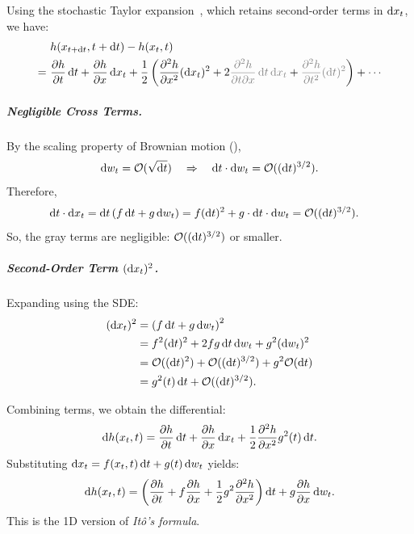 Using the stochastic Taylor expansion~\citep{kloeden1992stochastic}, which retains second-order terms in $\mathop{}\!\mathrm{d} x_t$, we have:
\begin{align*}
&h(x_{t+\diff t}, t+\diff t) 
- h(x_t, t) \\
=~&\frac{\partial h}{\partial t} \diff t 
+ \frac{\partial h}{\partial x} \diff x_t 
+ \frac{1}{2} \left( \frac{\partial^2 h}{\partial x^2} (\diff x_t)^2 
+ 2\textcolor{gray}{{\frac{\partial^2 h}{\partial t \partial x} \diff t \diff x_t}} 
+ \textcolor{gray}{{ \frac{\partial^2 h}{\partial t^2} (\diff t)^2}} \right)
+ \cdots
\end{align*}
\subparagraph{Negligible Cross Terms.}
By the scaling property of Brownian motion (), 
\[
\mathop{}\!\mathrm{d} w_t = \mathcal{O}(\sqrt{\mathop{}\!\mathrm{d} t}) \quad \Rightarrow \quad \mathop{}\!\mathrm{d} t \cdot \mathop{}\!\mathrm{d} w_t = \mathcal{O}((\mathop{}\!\mathrm{d} t)^{3/2}).
\]
Therefore,
\begin{align*}
\diff t \cdot \diff x_t 
&= \diff t \left(f \diff t + g \diff w_t\right) 
= f (\diff t)^2 + g \cdot \diff t \cdot \diff w_t 
= \mathcal{O}((\diff t)^{3/2}).
\end{align*}
So, the gray terms are negligible: $ \mathcal{O}((\mathop{}\!\mathrm{d} t)^{3/2}) $ or smaller.
\subparagraph{Second-Order Term $(\mathop{}\!\mathrm{d} x_t)^2$.}
Expanding using the SDE:
\begin{align*}
(\diff x_t)^2 
&= \left( f \diff t + g \diff w_t \right)^2 \\
&= f^2 (\diff t)^2 + 2fg \diff t \diff w_t + g^2 (\diff w_t)^2 \\
&= \mathcal{O}((\diff t)^2) + \mathcal{O}((\diff t)^{3/2}) + g^2 \mathcal{O}(\diff t) \\
&= g^2(t) \diff t + \mathcal{O}((\diff t)^{3/2}).
\end{align*}

Combining terms, we obtain the differential:
\[
\mathop{}\!\mathrm{d} h(x_t, t)
= \frac{\partial h}{\partial t} \mathop{}\!\mathrm{d} t
+ \frac{\partial h}{\partial x} \mathop{}\!\mathrm{d} x_t
+ \frac{1}{2} \frac{\partial^2 h}{\partial x^2} g^2(t) \mathop{}\!\mathrm{d} t.
\]
Substituting $ \mathop{}\!\mathrm{d} x_t = f(x_t, t) \mathop{}\!\mathrm{d} t + g(t) \mathop{}\!\mathrm{d} w_t $ yields:
\[
\mathop{}\!\mathrm{d} h(x_t, t)
= \left( \frac{\partial h}{\partial t} + f \frac{\partial h}{\partial x}
+ \frac{1}{2} g^2 \frac{\partial^2 h}{\partial x^2} \right) \mathop{}\!\mathrm{d} t
+ g \frac{\partial h}{\partial x} \mathop{}\!\mathrm{d} w_t.
\]
This is the 1D version of \emph{It\^o's formula}.



